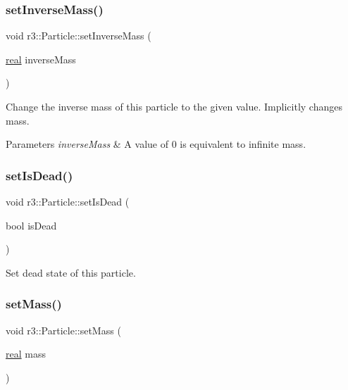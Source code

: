 \subsubsection{\texorpdfstring{set\+Inverse\+Mass()}{setInverseMass()}}
{\footnotesize\ttfamily void r3\+::\+Particle\+::set\+Inverse\+Mass (\begin{DoxyParamCaption}\item[{\mbox{\hyperlink{namespacer3_ab2016b3e3f743fb735afce242f0dc1eb}{real}}}]{inverse\+Mass }\end{DoxyParamCaption})}

Change the inverse mass of this particle to the given value. Implicitly changes mass. 
\begin{DoxyParams}{Parameters}
{\em inverse\+Mass} & A value of 0 is equivalent to infinite mass. \\
\hline
\end{DoxyParams}
\mbox{\label{classr3_1_1_particle_a1f0b0ac6f094025e02359026c681350f}} 
\subsubsection{\texorpdfstring{set\+Is\+Dead()}{setIsDead()}}
{\footnotesize\ttfamily void r3\+::\+Particle\+::set\+Is\+Dead (\begin{DoxyParamCaption}\item[{bool}]{is\+Dead }\end{DoxyParamCaption})}

Set dead state of this particle. \mbox{\label{classr3_1_1_particle_a01f396041b3b54d674e227d56d600f6b}} 
\subsubsection{\texorpdfstring{set\+Mass()}{setMass()}}
{\footnotesize\ttfamily void r3\+::\+Particle\+::set\+Mass (\begin{DoxyParamCaption}\item[{\mbox{\hyperlink{namespacer3_ab2016b3e3f743fb735afce242f0dc1eb}{real}}}]{mass }\end{DoxyParamCaption})}

